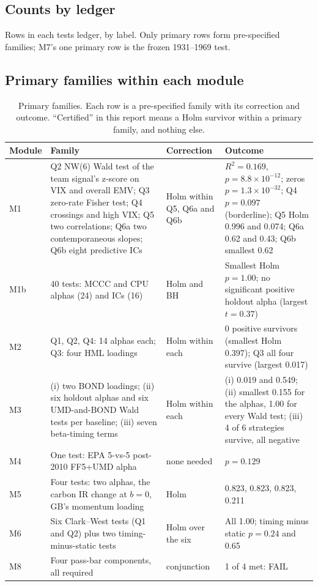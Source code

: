 \subsection{Counts by ledger}
\begin{table}[H]
\caption{Rows in each tests ledger, by label. Only primary rows form pre-specified families; M7's one primary row is the frozen 1931--1969 test.}
\label{tab:ledgers}
\centering\small

\end{table}

\subsection{Primary families within each module}
\begin{table}[H]
\caption{Primary families. Each row is a pre-specified family with its correction and outcome. ``Certified'' in this report means a Holm survivor within a primary family, and nothing else.}
\label{tab:families}
\centering\footnotesize
\setlength{\tabcolsep}{4pt}
\begin{tabularx}{\textwidth}{@{}L{1.2cm}YL{2.2cm}Y@{}}
\toprule
Module & Family & Correction & Outcome \\
\midrule
M1 & Q2 NW(6) Wald test of the team signal's z-score on VIX and overall EMV; Q3 zero-rate Fisher test; Q4 crossings and high VIX; Q5 two correlations; Q6a two contemporaneous slopes; Q6b eight predictive ICs & Holm within Q5, Q6a and Q6b & $R^2=0.169$, $p=8.8\times10^{-12}$; zeros $p=1.3\times10^{-32}$; Q4 $p=0.097$ (borderline); Q5 Holm 0.996 and 0.074; Q6a 0.62 and 0.43; Q6b smallest 0.62 \\
M1b & 40 tests: MCCC and CPU alphas (24) and ICs (16) & Holm and BH & Smallest Holm $p=1.00$; no significant positive holdout alpha (largest $t=0.37$) \\
M2 & Q1, Q2, Q4: 14 alphas each; Q3: four HML loadings & Holm within each & 0 positive survivors (smallest Holm 0.397); Q3 all four survive (largest 0.017) \\
M3 & (i) two BOND loadings; (ii) six holdout alphas and six UMD-and-BOND Wald tests per baseline; (iii) seven beta-timing terms & Holm within each & (i) 0.019 and 0.549; (ii) smallest 0.155 for the alphas, 1.00 for every Wald test; (iii) 4 of 6 strategies survive, all negative \\
M4 & One test: EPA 5-vs-5 post-2010 FF5+UMD alpha & none needed & $p=0.129$ \\
M5 & Four tests: two alphas, the carbon IR change at $b=0$, GB's momentum loading & Holm & 0.823, 0.823, 0.823, 0.211 \\
M6 & Six Clark--West tests (Q1 and Q2) plus two timing-minus-static tests & Holm over the six & All 1.00; timing minus static $p=0.24$ and 0.65 \\
M8 & Four pass-bar components, all required & conjunction & 1 of 4 met: FAIL \\
\bottomrule
\end{tabularx}
\end{table}

